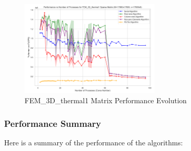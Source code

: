\documentclass[12pt,oneside]{book} %
\begin{document}
\begin{figure}[H]
    \centering
    \includegraphics[width=0.6\textwidth]{../results/matrix_dim/FEM_3D_thermal1_k6_performance.png}
    \caption{FEM\_3D\_thermal1 Matrix Performance Evolution}\label{fig:fem-3d-thermal1-k6-performance}
\end{figure}

\subsubsection{Performance Summary}
Here is a summary of the performance of the algorithms:
\end{document}
